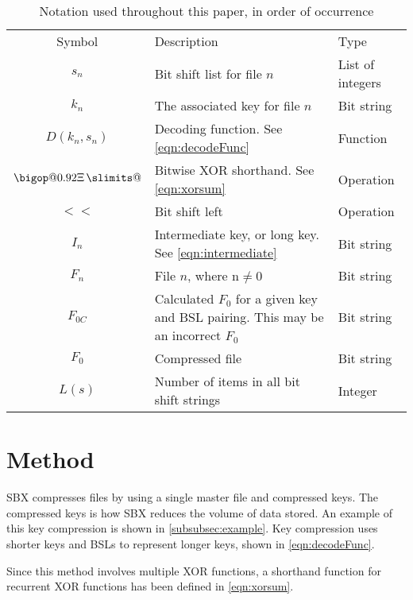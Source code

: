 \documentclass[10pt]{article}
\makeatletter
\DeclareRobustCommand\bigop[2][1]{%
  \mathop{\vphantom{\sum}\mathpalette\bigop@{{#1}{#2}}}\slimits@
}
\newcommand{\bigop@}[2]{\bigop@@#1#2}
\newcommand{\bigop@@}[3]{%
  \vcenter{%
    \sbox\z@{$#1\sum$}%
    \hbox{\resizebox{\ifx#1\displaystyle#2\fi\dimexpr\ht\z@+\dp\z@}{!}{$\m@th#3$}}%
  }%
}
\newcommand{\XORsum}{\DOTSB\bigop[0.92]{\Xi}}
\makeatother
\begin{document}
\begin{table}[ht]
    \centering
    \begin{tabular}{c >{\raggedleft\arraybackslash}p{5.5cm} >{\raggedleft\arraybackslash}p{3cm}}
        \hline
        Symbol & Description & Type \\
        \Xhline{3\arrayrulewidth}
        $s_n$ & Bit shift list for file $n$ & List of integers \\
        $k_n$ & The associated key for file $n$ & Bit string \\
        $D(k_n,s_n)$ & Decoding function. See \cref{eqn:decodeFunc} & Function \\
        $\XORsum$ & Bitwise XOR shorthand. See \cref{eqn:xorsum} & Operation \\
        $<<$ & Bit shift left & Operation \\
        $I_n$ & Intermediate key, or long key. See \cref{eqn:intermediate} & Bit string \\
        $F_n$ & File $n$, where n$\neq0$ & Bit string \\
        $F_{0C}$ & Calculated $F_0$ for a given key and BSL pairing. This may be an incorrect $F_0$ & Bit
        string \\
        $F_0$ & Compressed file & Bit string \\
        $L(s)$ & Number of items in all bit shift strings & Integer\\
        \hline
    \end{tabular}
    \caption{Notation used throughout this paper, in order of occurrence}
    \label{tab:notationTable}
\end{table}


\section{Method}

SBX compresses files by using a single master file and compressed keys. The compressed keys is how SBX reduces the volume of data stored. An example of this key compression is shown in \cref{subsubsec:example}. Key compression uses shorter keys and BSLs to represent longer keys, shown in \cref{eqn:decodeFunc}.

Since this method involves multiple XOR functions, a shorthand function for recurrent XOR functions has been defined in \cref{eqn:xorsum}.
\end{document}
